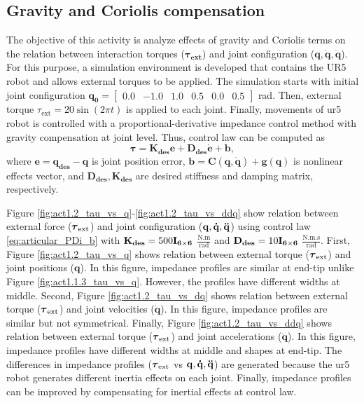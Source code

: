 \graphicspath{{images/act_1.2/}}
\subsection{Gravity and Coriolis compensation}
The objective of this activity is analyze effects of gravity and Coriolis terms on the relation between interaction torques ($\boldsymbol{\tau}_\mathbf{ext}$) and joint configuration ($\mathbf{q, \dot{q}, \ddot{q}}$). For this purpose, a simulation environment is developed that contains the UR5 robot and allows external torques to be applied. The simulation starts with initial joint configuration $\mathbf{q_0}=\begin{bmatrix} 0.0 & -1.0 & 1.0 & 0.5 & 0.0 & 0.5 \end{bmatrix}$ rad. Then, external torque $\tau_\mathrm{ext}= 20\sin{(2\pi t)}$ is applied to each joint. Finally, movements of ur5 robot is controlled with a proportional-derivative impedance control method with gravity compensation at joint level. Thus, control law can be computed as 
\begin{equation}
	\boldsymbol{\tau}
	= \mathbf{K_{des} e} + \mathbf{D_{des} \dot{e}} + \mathbf{b},
	\label{eq:articular_PDi_b}
\end{equation}
\noindent where $\mathbf{e}=\mathbf{q_{des} - q}$ is joint position error, $\mathbf{b}=\mathbf{C(q, \dot{q})} + \mathbf{g(q)}$ is nonlinear effects vector, and $\mathbf{D_{des}, K_{des}}$ are desired stiffness and damping matrix, respectively.

Figure \ref{fig:act1.2_tau_vs_q}-\ref{fig:act1.2_tau_vs_ddq} show relation between external force ($\boldsymbol{\tau}_\mathrm{ext}$) and joint configuration ($\mathbf{q, \dot{q}, \ddot{q}}$) using control law \eqref{eq:articular_PDi_b} with $\mathbf{K_{des}}=500\mathbf{I_{6 \times 6}}$ $\mathrm{\frac{N.m}{rad}}$ and $\mathbf{D_{des}}=10\mathbf{I_{6 \times 6}}$ $\mathrm{\frac{N.m.s}{rad}}$. First, Figure \ref{fig:act1.2_tau_vs_q} shows relation between external torque ($\boldsymbol{\tau}_\mathrm{ext}$) and joint positions ($\mathbf{q}$). In this figure, impedance profiles are similar at end-tip unlike Figure \ref{fig:act1.1.3_tau_vs_q}. However, the profiles have different widths at middle. Second, Figure \ref{fig:act1.2_tau_vs_dq} shows relation between external torque ($\boldsymbol{\tau}_\mathrm{ext}$) and joint velocities ($\mathbf{\dot{q}}$). In this figure, impedance profiles are similar but not symmetrical. Finally, Figure \ref{fig:act1.2_tau_vs_ddq} shows relation between external torque ($\boldsymbol{\tau}_\mathrm{ext}$) and joint accelerations ($\mathbf{\ddot{q}}$). In this figure, impedance profiles have different widths at middle and shapes at end-tip. The differences in impedance profiles ($\boldsymbol{\tau}_\mathrm{ext}$ vs $\mathbf{q, \dot{q}, \ddot{q}}$) are generated because the ur5 robot generates different inertia effects on each joint. Finally, impedance profiles can be improved by compensating for inertial effects at control law.


